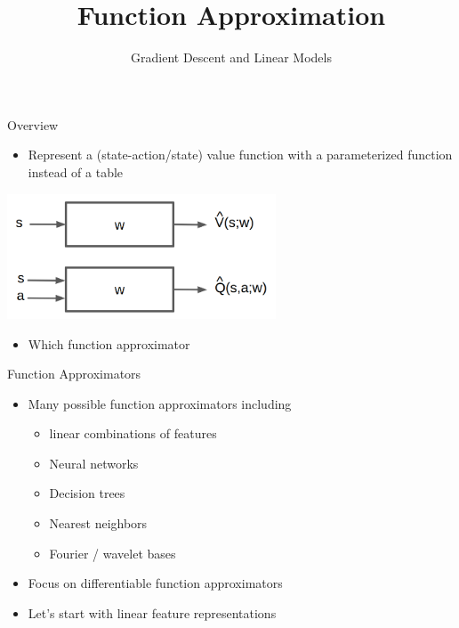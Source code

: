\documentclass[aspectratio=169]{../latex_main/tntbeamer}  %
\title[RL: Function Approximation]{Function Approximation}
\subtitle{Gradient Descent and Linear Models}
\begin{document}
	
	\maketitle

\begin{frame}[c]{Overview}
	
	
\begin{itemize}
	\item Represent a (state-action/state) value function with a parameterized
	function instead of a table
\end{itemize}

\begin{center}
	\includegraphics[width=0.6\textwidth]{images/vfa.png}
\end{center}

\begin{itemize}
	\item \alert{Which function approximator}
\end{itemize}

\end{frame}
\begin{frame}[c]{Function Approximators}
	
	
	\begin{itemize}
		\item Many possible function approximators including
		\begin{itemize}
			\item linear combinations of features
			\item Neural networks
			\item Decision trees
			\item Nearest neighbors 
			\item Fourier / wavelet bases
		\end{itemize}
		\item Focus on differentiable function approximators
		\item Let's start with linear feature representations
	\end{itemize}
	
\end{frame}
\end{document}
